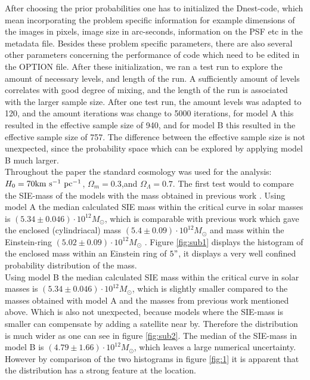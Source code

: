 \documentclass[useAMS,usenatbib]{mn2e}
\begin{document}
After choosing the prior probabilities one has to initialized the Dnest-code, which mean incorporating the problem specific information for
 example dimensions of the images in pixels, image size in arc-seconds, information on the PSF etc in the metadata file. 
 Besides these problem specific parameters, there are also several other parameters concerning the performance of code which need to be
  edited in the OPTION file. After these initialization, we ran a test run to explore the amount of necessary levels, and length of the run.
 A sufficiently amount of levels correlates with good degree of mixing, and the length of the run is associated with the larger sample
  size. After one test run, the amount levels was adapted to 120, and the amount iterations was change to 5000 iterations, for model A this resulted in the effective sample size of 940, and for model B this resulted in the effective sample size of 757.  The difference between the effective sample size is not unexpected, since the probability space which can be explored by applying model B much larger.  \\
Throughout the paper the standard cosmology was used for the analysis:  $H_0=70 \rm{km~s^{-1} ~pc^{-1}}$,  $\Omega_m = 0.3$,and  $\Omega_\Lambda= 0.7$. 
The first test would to compare the SIE-mass of the models with the mass obtained in previous  work \cite{Belokurov2007} \cite{Dye2008}.
Using model A the median  calculated SIE mass within the critical curve in solar masses is  $(5.34 \pm 0.046) \cdot 10^{12} M_\odot$, %
which is comparable with previous work which gave the enclosed (cylindriacal) mass $(5.4 \pm 0.09) \cdot 10^{12} M_\odot$ \cite{Belokurov2007} and  mass within the Einstein-ring $(5.02 \pm 0.09) \cdot 10^{12} M_\odot$ \cite{Dye2008}. Figure \ref{fig:sub1} displays the histogram of the enclosed mass within an Einstein ring of $5"$, it displays a very well confined probability distribution of the mass. \\ 
Using model B the median calculated SIE mass within the critical curve in solar masses is  $(5.34 \pm 0.046) \cdot 10^{12} M_\odot$, %
which is slightly smaller compared to the masses obtained with model A and the masses from previous work mentioned above. Which is also not unexpected, because models where the SIE-mass is smaller can compensate by adding a satellite near by. Therefore the distribution is much wider as one can see in figure \ref{fig:sub2}. The median of the SIE-mass in model B is $(4.79 \pm 1.66) \cdot 10^{12} M_\odot$, which leaves a large numerical uncertainty. However by comparison of the two histograms in figure \ref{fig:1} it is apparent that the distribution has a strong feature at the location. \\
 
\end{document}
